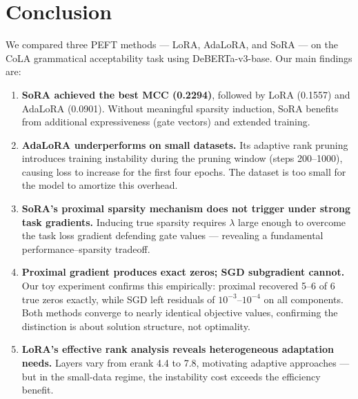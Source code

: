 \documentclass[12pt,a4paper]{article}
\theoremstyle{definition}
\begin{document}
\section{Conclusion}

We compared three PEFT methods — LoRA, AdaLoRA, and SoRA — on the CoLA grammatical acceptability task using DeBERTa-v3-base. Our main findings are:

\begin{enumerate}
    \item \textbf{SoRA achieved the best MCC (0.2294)}, followed by LoRA (0.1557) and AdaLoRA (0.0901). Without meaningful sparsity induction, SoRA benefits from additional expressiveness (gate vectors) and extended training.
    
    \item \textbf{AdaLoRA underperforms on small datasets.} Its adaptive rank pruning introduces training instability during the pruning window (steps 200--1000), causing loss to increase for the first four epochs. The dataset is too small for the model to amortize this overhead.
    
    \item \textbf{SoRA's proximal sparsity mechanism does not trigger under strong task gradients.} Inducing true sparsity requires $\lambda$ large enough to overcome the task loss gradient defending gate values — revealing a fundamental performance--sparsity tradeoff.
    
    \item \textbf{Proximal gradient produces exact zeros; SGD subgradient cannot.} Our toy experiment confirms this empirically: proximal recovered 5--6 of 6 true zeros exactly, while SGD left residuals of $10^{-3}$--$10^{-4}$ on all components. Both methods converge to nearly identical objective values, confirming the distinction is about solution structure, not optimality.
    
    \item \textbf{LoRA's effective rank analysis reveals heterogeneous adaptation needs.} Layers vary from erank 4.4 to 7.8, motivating adaptive approaches — but in the small-data regime, the instability cost exceeds the efficiency benefit.
\end{enumerate}
\end{document}
